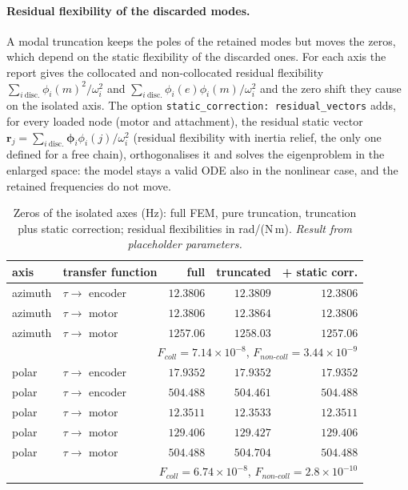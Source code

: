 \documentclass[10pt,a4paper]{article}
\numberwithin{equation}{section}
\begin{document}
\paragraph{Residual flexibility of the discarded modes.} A modal truncation keeps the poles of the retained modes but moves the zeros, which depend on the static flexibility of the discarded ones. For each axis the report gives the collocated and non-collocated residual flexibility $\sum_{i\ \text{disc.}}\phi_i(m)^2/\omega_i^2$ and $\sum_{i\ \text{disc.}}\phi_i(e)\phi_i(m)/\omega_i^2$ and the zero shift they cause on the isolated axis. The option \texttt{static\_correction: residual\_vectors} adds, for every loaded node (motor and attachment), the residual static vector $\mathbf r_j = \sum_{i\ \text{disc.}}\boldsymbol\phi_i\phi_i(j)/\omega_i^2$ (residual flexibility with inertia relief, the only one defined for a free chain), orthogonalises it and solves the eigenproblem in the enlarged space: the model stays a valid ODE also in the nonlinear case, and the retained frequencies do not move.
\begin{table}[H]\centering\small
\caption{Zeros of the isolated axes (Hz): full FEM, pure truncation, truncation plus static correction; residual flexibilities in rad/(N\,m). \emph{Result from placeholder parameters.}}\label{tab:modal_zeros}
\begin{tabular}{llrrr}\toprule
axis & transfer function & full & truncated & + static corr. \\ \midrule
azimuth & $\tau\to$ encoder & $12.3806$ & $12.3809$ & $12.3806$ \\
azimuth & $\tau\to$ motor & $12.3806$ & $12.3864$ & $12.3806$ \\
azimuth & $\tau\to$ motor & $1257.06$ & $1258.03$ & $1257.06$ \\
\multicolumn{5}{r}{\footnotesize $F_{coll} = 7.14\times10^{-8}$, $F_{non\text{-}coll} = 3.44\times10^{-9}$} \\ \midrule
polar & $\tau\to$ encoder & $17.9352$ & $17.9352$ & $17.9352$ \\
polar & $\tau\to$ encoder & $504.488$ & $504.461$ & $504.488$ \\
polar & $\tau\to$ motor & $12.3511$ & $12.3533$ & $12.3511$ \\
polar & $\tau\to$ motor & $129.406$ & $129.427$ & $129.406$ \\
polar & $\tau\to$ motor & $504.488$ & $504.704$ & $504.488$ \\
\multicolumn{5}{r}{\footnotesize $F_{coll} = 6.74\times10^{-8}$, $F_{non\text{-}coll} = 2.8\times10^{-10}$} \\ \midrule
\bottomrule\end{tabular}\end{table}
\end{document}
